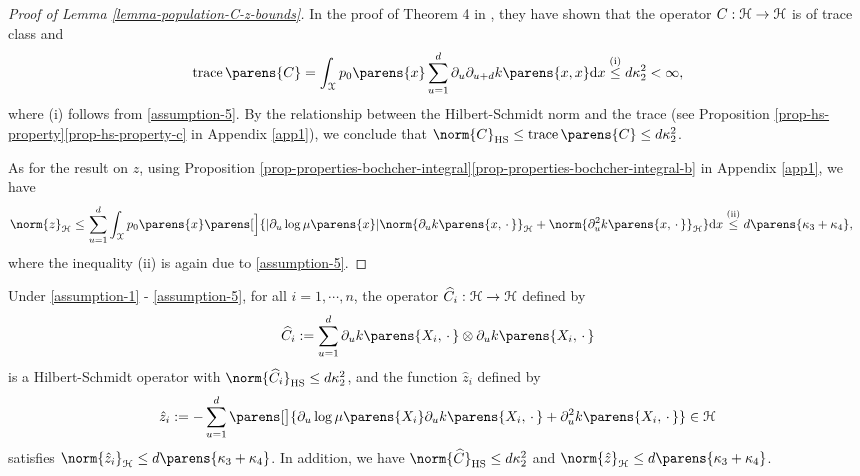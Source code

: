 \begin{proof}[Proof of Lemma \ref{lemma-population-C-z-bounds}]
	In the proof of Theorem 4 in \textcite{Sriperumbudur-density-estimation-inf-exp-family}, they have shown that the operator $C: \mathcal{H} \to \mathcal{H}$ is of trace class and 
	\begin{align*}
		\trace \parens{C} = \int_{\calX} p_0 \parens{x} \sum_{u=1}^d \partial_u \partial_{u+d} k \parens{x, x} \diff x \stackrel{\text{(i)}}{\le} d \kappa_2^2 < \infty, 
	\end{align*}
	where (i) follows from \ref{assumption-5}. By the relationship between the Hilbert-Schmidt norm and the trace (see Proposition \ref{prop-hs-property}\ref{prop-hs-property-c} in Appendix \ref{app1}), we conclude that $\norm{C}_{\mathrm{HS}} \le \trace \parens{C} \le d \kappa_2^2$. 
	
	As for the result on $z$, using Proposition \ref{prop-properties-bochcher-integral}\ref{prop-properties-bochcher-integral-b} in Appendix \ref{app1}, we have  
	\begin{align*}
		\norm{z}_{\calH} \le & \, \sum_{u=1}^d \int_{\calX} p_0 \parens{x} \parens[\Big]{\abs{{\partial_u \log \mu \parens{x}}} \norm{\partial_u k \parens{x, \,\cdot\,}}_{\calH} + \norm{\partial_u^2 k \parens{x, \,\cdot\,}}_{\calH}} \diff x 
		\stackrel{\text{(ii)}}{\le} d \parens{\kappa_3 + \kappa_4}, 
	\end{align*}
	where the inequality (ii) is again due to \ref{assumption-5}. 
\end{proof}

\begin{lemma}\label{lemma-sample-C-z-bounds}
	Under \ref{assumption-1} - \ref{assumption-5}, for all $i = 1, \cdots, n$, the operator $\widehat{C}_i: \mathcal{H} \to \mathcal{H}$ defined by 
	\begin{align}\label{eq-def-Ci}
		\widehat{C}_i := \sum_{u=1}^d \partial_u k \parens{X_i, \,\cdot\,} \otimes \partial_u k \parens{X_i, \,\cdot\,}
	\end{align}
	is a Hilbert-Schmidt operator with $\norm{\widehat{C}_i}_{\mathrm{HS}} \le d \kappa_2^2$, and the function $\hat{z}_i$ defined by 
	\begin{align}\label{eq-def-zi}
		\hat{z}_i := - \sum_{u=1}^d \parens[\big]{\partial_u \log \mu \parens{X_i} \partial_u k \parens{X_i, \,\cdot\,} + \partial_u^2 k \parens{X_i, \,\cdot\,}} \in \calH
	\end{align}
	satisfies $\norm{\hat{z}_i}_{\calH} \le d \parens{\kappa_3 + \kappa_4}$. In addition, we have $\norm{\widehat{C}}_{\mathrm{HS}} \le d \kappa_2^2$ and $\norm{\hat{z}}_{\calH} \le d \parens{\kappa_3 + \kappa_4}$. 
\end{lemma}

